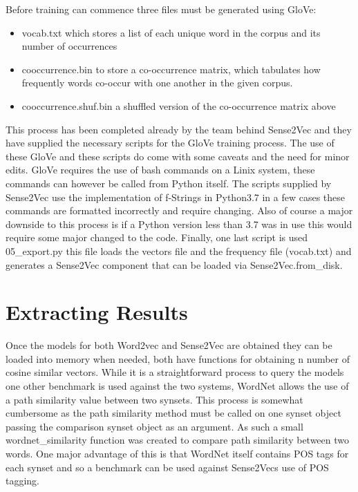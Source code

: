 \noindent
Before training can commence three files must be generated using GloVe: 
\begin{itemize}
  \item vocab.txt which stores a list of each unique word in the corpus and its number of occurrences
  \item cooccurrence.bin to store a co-occurrence matrix, which tabulates how frequently words co-occur with one another in the given corpus.
  \item cooccurrence.shuf.bin a shuffled version of the co-occurrence matrix above
\end{itemize}
This process has been completed already by the team behind Sense2Vec and they have supplied the necessary scripts for the GloVe training process. The use of these GloVe and these scripts do come with some caveats and the need for minor edits. GloVe requires the use of bash commands on a Linix system, these commands can however be called from Python itself. The scripts supplied by Sense2Vec use the implementation of f-Strings in Python3.7 in a few cases these commands are formatted incorrectly and require changing. Also of course a major downside to this process is if a Python version less than 3.7 was in use this would require some major changed to the code. Finally, one last script is used 05\_export.py this file loads the vectors file and the frequency file (vocab.txt) and generates a Sense2Vec component that can be loaded via Sense2Vec.from\_disk.

\section{Extracting Results}
Once the models for both Word2vec and Sense2Vec are obtained they can be loaded into memory when needed, both have functions for obtaining n number of cosine similar vectors. While it is a straightforward process to query the models one other benchmark is used against the two systems, WordNet allows the use of a path similarity value between two synsets. This process is somewhat cumbersome as the path similarity method must be called on one synset object passing the comparison synset object as an argument. As such a small wordnet\_similarity function was created to compare path similarity between two words. One major advantage of this is that WordNet itself contains POS tags for each synset and so a benchmark can be used against Sense2Vecs use of POS tagging.

